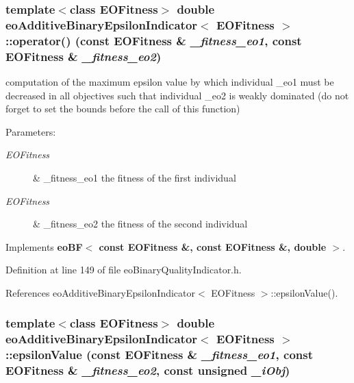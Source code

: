 \subsubsection{\setlength{\rightskip}{0pt plus 5cm}template$<$class EOFitness$>$ double {\bf eo\-Additive\-Binary\-Epsilon\-Indicator}$<$ EOFitness $>$::operator() (const EOFitness \& {\em \_\-fitness\_\-eo1}, const EOFitness \& {\em \_\-fitness\_\-eo2})\hspace{0.3cm}{\tt  [inline, virtual]}}\label{classeoAdditiveBinaryEpsilonIndicator_5fd885a2a555e26706174a44ef636f4d}


computation of the maximum epsilon value by which individual \_\-eo1 must be decreased in all objectives such that individual \_\-eo2 is weakly dominated (do not forget to set the bounds before the call of this function) 

\begin{Desc}
\item[Parameters:]
\begin{description}
\item[{\em EOFitness}]\& \_\-fitness\_\-eo1 the fitness of the first individual \item[{\em EOFitness}]\& \_\-fitness\_\-eo2 the fitness of the second individual \end{description}
\end{Desc}


Implements {\bf eo\-BF$<$ const EOFitness \&, const EOFitness \&, double $>$}.

Definition at line 149 of file eo\-Binary\-Quality\-Indicator.h.

References eo\-Additive\-Binary\-Epsilon\-Indicator$<$ EOFitness $>$::epsilon\-Value().
\subsubsection{\setlength{\rightskip}{0pt plus 5cm}template$<$class EOFitness$>$ double {\bf eo\-Additive\-Binary\-Epsilon\-Indicator}$<$ EOFitness $>$::epsilon\-Value (const EOFitness \& {\em \_\-fitness\_\-eo1}, const EOFitness \& {\em \_\-fitness\_\-eo2}, const unsigned {\em \_\-i\-Obj})\hspace{0.3cm}{\tt  [inline, private]}}\label{classeoAdditiveBinaryEpsilonIndicator_8f35162769a1b23ada83e5fb21cc74e7}


